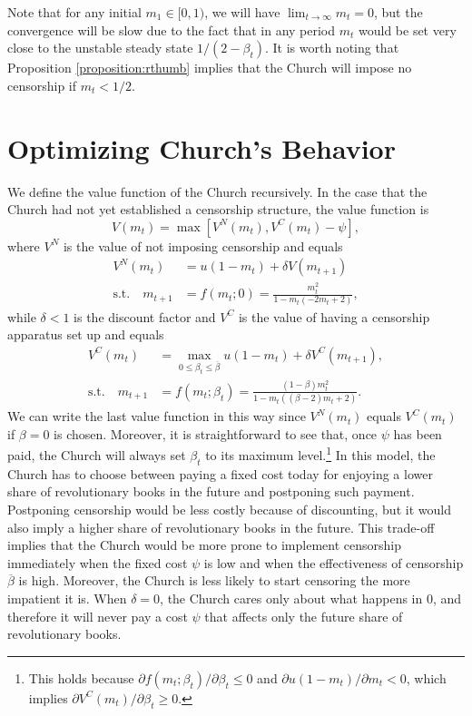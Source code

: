 Note that for any initial $m_1 \in [0,1)$, we will have $\lim_{t\to\infty}m_t=0$, but the convergence will be slow due to the fact that in any period $m_t$ would be set very close to the unstable steady state $1/(2-\beta_t)$. It is worth noting that Proposition \ref{proposition:rthumb} implies that the Church will impose no censorship if $m_t<1/2$.








\section{Optimizing Church's Behavior}\label{app:recursive}

 We  define the value function of the Church recursively. In the case that the Church had not yet established a censorship structure, the value function is
\begin{equation*}	
	V(m_{t})=\max[V^N(m_{t}),V^C(m_{t})-\psi],
\end{equation*}
where $V^{N}$ is the value of not imposing censorship and equals
\begin{align*}
V^{N}(m_{t})&=u(1-m_{t})+\delta V(m_{t+1})	\\
	 \text{s.t.}\quad m_{t+1}&=f(m_{t};0)=\frac{ m_{t}^2}{1-m_{t} (-2 m_{t}+2)},
\end{align*}
while $\delta<1$ is the discount factor and  $V^{C}$ is the value of having a censorship apparatus set up and equals
\begin{align*}
V^{C}(m_{t})&=\max_{0\leq\beta_t\leq\overline{\beta}}u(1-m_{t})+\delta V^C(m_{t+1}),	\\
	 \text{s.t.}\quad m_{t+1}&=f(m_{t};\beta_t)=\frac{(1-\beta) m_{t}^2}{1-m_{t} ((\beta -2) m_{t}+2)}.
\end{align*}
We can write the last value function in this way since $V^N(m_{t})$ equals $V^C(m_{t})$ if $\beta=0$ is chosen. Moreover, it is straightforward to see that, once $\psi$ has been paid, the Church will always set $\beta_t$ to its maximum level.\footnote{This holds because $\partial f(m_{t};\beta_t)/\partial\beta_t\leq 0$ and $\partial u(1-m_t)/\partial m_t<0$, which implies $\partial V^C(m_t)/\partial \beta_t\geq 0$.} In this model, the Church has to choose between paying a fixed cost today for enjoying a lower share of revolutionary books in the future and postponing such payment. Postponing censorship would be less costly because of discounting, but it would also imply a higher share of revolutionary books in the future. This trade-off implies that the Church would be more prone to implement censorship immediately when the fixed cost $\psi$ is low and when the effectiveness of censorship $\overline{\beta}$ is high. Moreover, the Church is less likely to start censoring the more impatient it is. When $\delta=0$, the Church cares only about what happens in 0, and therefore it will never pay a cost $\psi$ that affects only the future share of revolutionary books.
